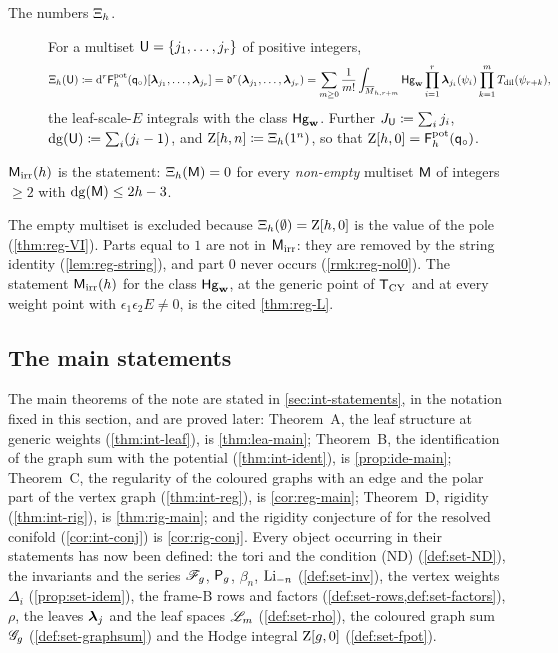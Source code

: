 \begin{defn}
\begin{description}
\item[The numbers $\Xi_h$.] For a multiset $\mathsf{U}=\{j_1,\ldots,j_r\}$ of positive integers,
\[
\Xi_h(\mathsf{U})\coloneqq\mathrm{d}^r\mathsf{F}^{\mathrm{pot}}_h(\mathsf{q}_{\circ})[\boldsymbol{\lambda}_{j_1},\ldots,\boldsymbol{\lambda}_{j_r}]=\mathfrak{d}^r(\boldsymbol{\lambda}_{j_1},\ldots,\boldsymbol{\lambda}_{j_r})=\sum_{m\geq0}\frac{1}{m!}\int_{\overline{M}_{h,r+m}}\mathsf{Hg}_{\mathbf{w}}\prod_{i=1}^{r}\boldsymbol{\lambda}_{j_i}(\psi_i)\prod_{k=1}^{m}T_{\mathrm{dil}}(\psi_{r+k}),
\]
the leaf-scale-$E$ integrals with the class $\mathsf{Hg}_{\mathbf{w}}$. Further $J_{\mathsf{U}}\coloneqq\sum_ij_i$, $\mathrm{dg}(\mathsf{U})\coloneqq\sum_i(j_i-1)$, and $\mathrm{Z}[h,n]\coloneqq\Xi_h(1^n)$, so that $\mathrm{Z}[h,0]=\mathsf{F}^{\mathrm{pot}}_h(\mathsf{q}_{\circ})$.
\end{description}
\end{defn}

\begin{defn}
\label{def:set-mirr}
$\mathsf{M}_{\mathrm{irr}}(h)$ is the statement: $\Xi_h(\mathsf{M})=0$ for every \emph{non-empty} multiset $\mathsf{M}$ of integers $\geq2$ with $\mathrm{dg}(\mathsf{M})\leq2h-3$.
\end{defn}

The empty multiset is excluded because $\Xi_h(\emptyset)=\mathrm{Z}[h,0]$ is the value of the pole (\cref{thm:reg-VI}). Parts equal to $1$ are not in $\mathsf{M}_{\mathrm{irr}}$: they are removed by the string identity (\cref{lem:reg-string}), and part $0$ never occurs (\cref{rmk:reg-nol0}). The statement $\mathsf{M}_{\mathrm{irr}}(h)$ for the class $\mathsf{Hg}_{\mathbf{w}}$, at the generic point of $\mathsf{T}_{\mathrm{CY}}$ and at every weight point with $\epsilon_1\epsilon_2E\neq0$, is the cited \cref{thm:reg-L}.

\subsection{The main statements}
\label{sec:set-statements}

The main theorems of the note are stated in \cref{sec:int-statements}, in the notation fixed in this section, and are proved later: Theorem~A, the leaf structure at generic weights (\cref{thm:int-leaf}), is \cref{thm:lea-main}; Theorem~B, the identification of the graph sum with the potential (\cref{thm:int-ident}), is \cref{prop:ide-main}; Theorem~C, the regularity of the coloured graphs with an edge and the polar part of the vertex graph (\cref{thm:int-reg}), is \cref{cor:reg-main}; Theorem~D, rigidity (\cref{thm:int-rig}), is \cref{thm:rig-main}; and the rigidity conjecture of \cite{BS} for the resolved conifold (\cref{cor:int-conj}) is \cref{cor:rig-conj}. Every object occurring in their statements has now been defined: the tori and the condition (ND) (\cref{def:set-ND}), the invariants and the series $\mathscr{F}_g$, $\mathsf{P}_{g}$, $\beta_n$, $\operatorname{Li}_{-n}$ (\cref{def:set-inv}), the vertex weights $\Delta_i$ (\cref{prop:set-idem}), the frame-B rows and factors (\cref{def:set-rows,def:set-factors}), $\rho$, the leaves $\boldsymbol{\lambda}_j$ and the leaf spaces $\mathscr{L}_m$ (\cref{def:set-rho}), the coloured graph sum $\mathscr{G}_g$ (\cref{def:set-graphsum}) and the Hodge integral $\mathrm{Z}[g,0]$ (\cref{def:set-fpot}).
